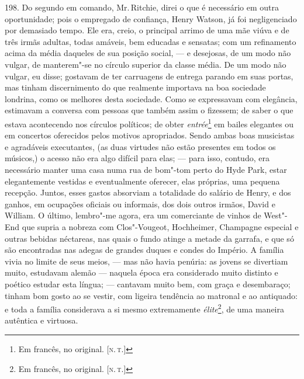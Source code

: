 198. Do segundo em comando, Mr.\,Ritchie, direi o que é necessário em
outra oportunidade; pois o empregado de confiança, Henry Watson, já foi
negligenciado por demasiado tempo. Ele era, creio, o principal arrimo de
uma mãe viúva e de três irmãs adultas, todas amáveis, bem educadas e
sensatas; com um refinamento acima da média daqueles de sua posição
social, --- e desejosas, de um modo não vulgar, de manterem"-se no círculo
superior da classe média. De um modo não vulgar, eu disse; gostavam de
ter carruagens de entrega parando em suas portas, mas tinham
discernimento do que realmente importava na boa sociedade londrina, como
os melhores desta sociedade. Como se expressavam com elegância,
estimavam a conversa com pessoas que também assim o fizessem; de saber o
que estava acontecendo nos círculos políticos; de obter
\emph{entrée}\footnote{Em francês, no original. {[}\textsc{n.\,t.}{]}} em bailes
elegantes ou em concertos oferecidos pelos motivos apropriados. Sendo
ambas boas musicistas e agradáveis executantes, (as duas virtudes não
estão presentes em todos os músicos,) o acesso não era algo difícil para
elas; --- para isso, contudo, era necessário manter uma casa numa rua de
bom"-tom perto do Hyde Park, estar elegantemente vestidas e eventualmente
oferecer, elas próprias, uma pequena recepção. Juntos, esses gastos
absorviam a totalidade do salário de Henry, e dos ganhos, em ocupações
oficiais ou informais, dos dois outros irmãos, David e William. O
último, lembro"-me agora, era um comerciante de vinhos de West"-End que
supria a nobreza com Clos"-Vougeot, Hochheimer, Champagne especial e
outras bebidas néctareas, nas quais o fundo atinge a metade da garrafa,
e que só são encontradas nas adegas de grandes duques e condes do
Império. A família vivia no limite de seus meios, --- mas não havia
penúria: as jovens se divertiam muito, estudavam alemão --- naquela época
era considerado muito distinto e poético estudar esta língua; ---
cantavam muito bem, com graça e desembaraço; tinham bom gosto ao se
vestir, com ligeira tendência ao matronal e ao antiquado: e toda a
família considerava a si mesmo extremamente \emph{élite}\footnote{Em
  francês, no original. {[}\textsc{n.\,t.}{]}}, de uma maneira autêntica e
virtuosa.


